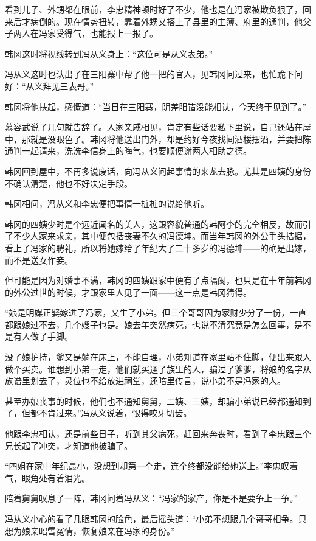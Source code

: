 看到儿子、外甥都在眼前，李忠精神顿时好了不少，他也是在冯家被欺负狠了，回来后才病倒的。现在情势扭转，靠着外甥又搭上了县里的主簿、府里的通判，他父子两人在冯家受得气，也能报上一报了。

韩冈这时将视线转到冯从义身上：“这位可是从义表弟。”

冯从义这时也认出了在三阳寨中帮了他一把的官人，见韩冈问过来，也忙跪下问好：“从义拜见三表哥。”

韩冈将他扶起，感慨道：“当日在三阳寨，阴差阳错没能相认，今天终于见到了。”

慕容武说了几句就告辞了。人家亲戚相见，肯定有些话要私下里说，自己还站在屋中，那就是没眼色了。韩冈将他送出门外，却是约好今夜找间酒楼摆酒，并要把陈通判一起请来，洗洗李信身上的晦气，也要顺便谢两人相助之德。

韩冈回到屋中，不再多说废话，向冯从义问起事情的来龙去脉。尤其是四姨的身份不确认清楚，他也不好决定手段。

韩冈相问，冯从义和李忠便把事情一桩桩的说给他听。

韩冈的四姨少时是个远近闻名的美人，这跟容貌普通的韩阿李的完全相反，故而引了不少人家来求亲，其中便包括丧妻不久的冯德坤。而当年韩冈的外公手头拮据，看上了冯家的聘礼，所以将她嫁给了年纪大了二十多岁的冯德坤——的确是出嫁，而不是送女作妾。

但可能是因为对婚事不满，韩冈的四姨跟家中便有了点隔阂，也只是在十年前韩冈的外公过世的时候，才跟家里人见了一面——这一点是韩冈猜得。

“娘是明媒正娶嫁进了冯家，又生了小弟。但三个哥哥因为家财少分了一份，一直都跟娘过不去，几个嫂子也是。娘去年突然病死，也说不清究竟是怎么回事，是不是有人做了手脚。

没了娘护持，爹又是躺在床上，不能自理，小弟知道在家里站不住脚，便出来跟人做个买卖。谁想到小弟一走，他们就买通了族里的人，骗过了爹爹，将娘的名字从族谱里划去了，灵位也不给放进祠堂，还暗里传言，说小弟不是冯家的人。

甚至办娘丧事的时候，他们也不通知舅舅，二姨、三姨，却骗小弟说已经都通知到了，但都不肯过来。”冯从义说着，恨得咬牙切齿。

他跟李忠相认，还是前些日子，听到其父病死，赶回来奔丧时，看到了李忠跟三个兄长起了冲突，才知道他被骗了。

“四姐在家中年纪最小，没想到却第一个走，连个终都没能给她送上。”李忠叹着气，眼角处有着泪光。

陪着舅舅叹息了一阵，韩冈问着冯从义：“冯家的家产，你是不是要争上一争。”

冯从义小心的看了几眼韩冈的脸色，最后摇头道：“小弟不想跟几个哥哥相争。只想为娘亲昭雪冤情，恢复娘亲在冯家的身份。”


